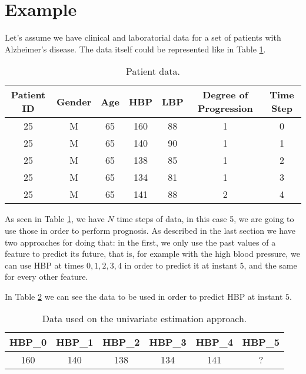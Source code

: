 %

\section{Example}
\label{section:example}

Let’s assume we have clinical and laboratorial data for a set of patients with Alzheimer’s disease. The data itself could be 
represented like in Table \ref{tab:diagnostic}. 

\begin{table}[h]
	\begin{center}
		\begin{tabular}{ccccccc}
			\textbf{Patient ID} & \textbf{Gender} & \textbf{Age} & \textbf{HBP} & \textbf{LBP} & \textbf{Degree of Progression} & \textbf{Time Step} \\ \hline
			25         & M      & 65  & 160 & 88  & 1                     & 0         \\
			25         & M      & 65  & 140 & 90  & 1                     & 1         \\
			25         & M      & 65  & 138 & 85  & 1                     & 2         \\
			25         & M      & 65  & 134 & 81  & 1                     & 3         \\
			25         & M      & 65  & 141 & 88  & 2                     & 4         \\ \hline
		\end{tabular}
		\caption{Patient data.}
		\label{tab:diagnostic}
	\end{center}
\end{table}

As seen in Table \ref{tab:diagnostic}, we have $N$ time steps of data, in this case 5, we are going to use those in order to perform prognosis. As described
in the last section we have two approaches for doing that: in the first, we only use the past values of a feature to predict its future, that is, for example with the high blood pressure, we can use HBP at times $0,1,2,3,4$ in order to predict it at instant $5$, and
the same for every other feature.

In Table \ref{tab:approach1} we can see the data to be used in order to predict HBP at instant $5$.

\begin{table}[h]
	\begin{center}
		\begin{tabular}{cccccc}
			\textbf{HBP\_0} & \textbf{HBP\_1} & \textbf{HBP\_2} & \textbf{HBP\_3} & \textbf{HBP\_4} & \textbf{HBP\_5} \\ \hline
			160             & 140             & 138             & 134             & 141             & ?					\\ \hline        
		\end{tabular}
		\caption{Data used on the univariate estimation approach.}
		\label{tab:approach1}
	\end{center}
\end{table} 

